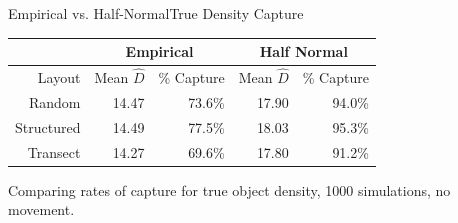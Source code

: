 \documentclass{beamer}
\begin{document}
\begin{frame}{Empirical vs. Half-Normal}{True Density Capture}
\begin{table}

	\begin{tabular}{ r| r r| r r|}
		           & \multicolumn{2}{|c|}{Empirical} & \multicolumn{2}{|c|}{Half Normal} \\ \hline\hline
		Layout     & Mean $\hat{D}$ & \% Capture     & Mean $\hat{D}$ & \% Capture       \\ \hline\hline
		Random     & 14.47          & 73.6\%         & 17.90          & 94.0\%           \\
		Structured & 14.49          & 77.5\%         & 18.03          & 95.3\%           \\
		Transect   & 14.27          & 69.6\%         & 17.80          & 91.2\%           \\ \hline
	\end{tabular}

\end{table}

\small
Comparing rates of capture for true object density, 1000 simulations, no movement.

\end{frame}
\end{document}
